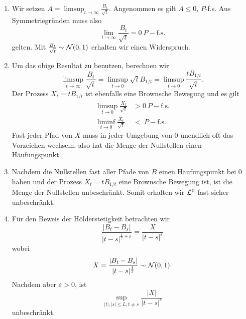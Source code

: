 \begin{enumerate}
    \item Wir setzen $A=\limsup_{t\to \infty} \frac{B_t}{\sqrt{t}}$. Angenommen
        es gilt $A\leq 0$, $P$-f.s. Aus Symmetriegründen muss also
        \begin{equation*}
            \lim_{t\to\infty} \frac{B_t}{\sqrt{t}} = 0 \ P-\text{f.s.}
        \end{equation*}
        gelten. Mit $\frac{B_t}{\sqrt{t}}\sim \mathcal N(0,1)$ erhalten wir einen Widerspruch.
    \item Um das obige Resultat zu benutzen, berechnen wir
        \begin{equation*}
            \limsup_{t\to\infty} \frac{B_t}{\sqrt{t}} = 
            \limsup_{t\to 0} \sqrt{t} B_{1/t} = 
            \limsup_{t\to 0} \frac{t B_{1/t}}{\sqrt{t}}. 
        \end{equation*}
        Der Prozess $X_t = t B_{1/t}$ ist ebenfalls eine Brownsche Bewegung und
        es gilt
        \begin{align*}
            \limsup_{t\to 0} \frac{X_t}{\sqrt{t}} & > 0 \ P-\text{f.s.} \\
            \liminf_{t\to 0} \frac{X_t}{\sqrt{t}} & < \ P-\text{f.s.}.
        \end{align*}
        Fast jeder Pfad von $X$ muss in jeder Umgebung von $0$ unendlich oft
        das Vorzeichen wechseln, also hat die Menge der Nullstellen einen
        Häufungspunkt. 
    \item Nachdem die Nullstellen fast aller Pfade von $B$ einen Häufungspunkt bei
        $0$ haben und der Prozess $X_t = t B_{1/t}$ eine Brownsche Bewegung ist,
        ist die Menge der Nullstellen unbeschränkt. Somit erhalten wir 
        $\mathcal L^{0}$ fast sicher unbeschränkt. 
    \item Für den Beweis der Hölderstetigkeit betrachten wir
        \begin{equation*}
            \frac{| B_t - B_s|}{ |t-s|^{\frac{1}{2}+\varepsilon} } = 
            \frac{X}{|t-s|^{\varepsilon}}
        \end{equation*}
        wobei
        \begin{equation*}
            X = \frac{| B_t - B_s|}{ |t-s|^{\frac{1}{2}}} \sim \mathcal N(0,1).
        \end{equation*}
        Nachdem aber $\varepsilon>0$, ist
        \begin{equation*}
            \sup_{|t|,|s| \leq L, t\neq s} \frac{|X|}{|t-s|^{\varepsilon}}
        \end{equation*}
        unbeschränkt. 
\end{enumerate}




